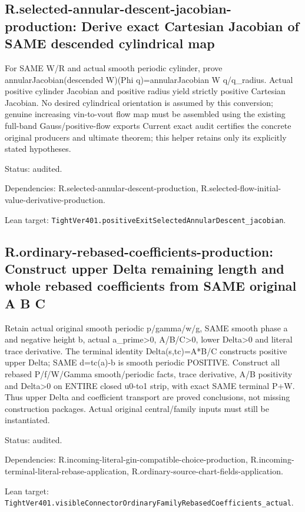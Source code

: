\documentclass{article}
\begin{document}
\subsection*{R.selected-annular-descent-jacobian-production: Derive exact Cartesian Jacobian of SAME descended cylindrical map}
For SAME W/R and actual smooth periodic cylinder, prove annularJacobian(descended W)(Phi q)=annularJacobian W q/q\_radius. Actual positive cylinder Jacobian and positive radius yield strictly positive Cartesian Jacobian. No desired cylindrical orientation is assumed by this conversion; genuine increasing vin-to-vout flow map must be assembled using the existing full-band Gauss/positive-flow exports Current exact audit certifies the concrete original producers and ultimate theorem; this helper retains only its explicitly stated hypotheses.
\par Status: audited.
\par Dependencies: R.selected-annular-descent-production, R.selected-flow-initial-value-derivative-production.
\par Lean target: \texttt{TightVer401.positiveExitSelectedAnnularDescent\_jacobian}.
\subsection*{R.ordinary-rebased-coefficients-production: Construct upper Delta remaining length and whole rebased coefficients from SAME original A B C}
Retain actual original smooth periodic p/gamma/w/g, SAME smooth phase a and negative height b, actual a\_prime>0, A/B/C>0, lower Delta>0 and literal trace derivative. The terminal identity Delta(s,tc)=A*B/C constructs positive upper Delta; SAME d=tc(a)-b is smooth periodic POSITIVE. Construct all rebased P/f/W/Gamma smooth/periodic facts, trace derivative, A/B positivity and Delta>0 on ENTIRE closed u0-to1 strip, with exact SAME terminal P+W. Thus upper Delta and coefficient transport are proved conclusions, not missing construction packages. Actual original central/family inputs must still be instantiated.
\par Status: audited.
\par Dependencies: R.incoming-literal-gin-compatible-choice-production, R.incoming-terminal-literal-rebase-application, R.ordinary-source-chart-fields-application.
\par Lean target: \texttt{TightVer401.visibleConnectorOrdinaryFamilyRebasedCoefficients\_actual}.
\end{document}
